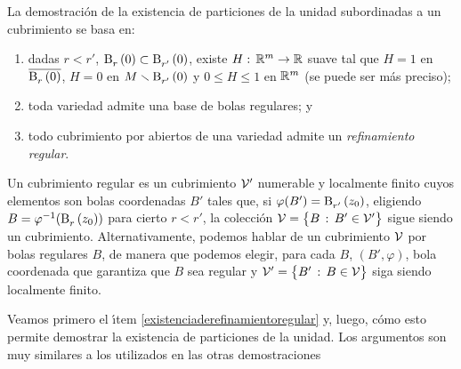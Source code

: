 La demostraci\'{o}n de la existencia de particiones de la unidad subordinadas a
un cubrimiento se basa en:
\begin{enumerate}
	\item dadas $r<r'$, $\bola{r}{0}\subset\bola{r'}{0}$, existe
		$H:\,\bb R^m\rightarrow\bb R$ suave tal que $H=1$ en
		$\clos{\bola{r}{0}}$, $H=0$ en $M\setmin\bola{r'}{0}$ y
		$0\leq H\leq 1$ en $\bb R^m$ (se puede ser m\'{a}s preciso);
	\item toda variedad admite una base de bolas regulares; y
	\item\label{existenciaderefinamientoregular}
		todo cubrimiento por abiertos de una variedad admite un
		\emph{refinamiento regular}.
\end{enumerate}
%
Un cubrimiento regular es un cubrimiento $\cal V'$ numerable y localmente
finito cuyos elementos son bolas coordenadas $B'$ tales que, si
$\varphi(B')=\bola{r'}{z_0}$, eligiendo $B=\varphi^{-1}(\bola{r}{z_0})$ para
cierto $r<r'$, la colecci\'{o}n $\cal V=\big\{B\,:\,B'\in\cal V'\big\}$ sigue
siendo un cubrimiento. Alternativamente, podemos hablar de un cubrimiento
$\cal V$ por bolas regulares $B$, de manera que podemos elegir, para cada $B$,
$(B',\varphi)$, bola coordenada que garantiza que $B$ sea regular y
$\cal V'=\big\{B'\,:\,B\in\cal V\big\}$ siga siendo localmente finito.

Veamos primero el \'{\i}tem \ref{existenciaderefinamientoregular} y, luego,
c\'{o}mo esto permite demostrar la existencia de particiones de la unidad. Los
argumentos son muy similares a los utilizados en las otras demostraciones

